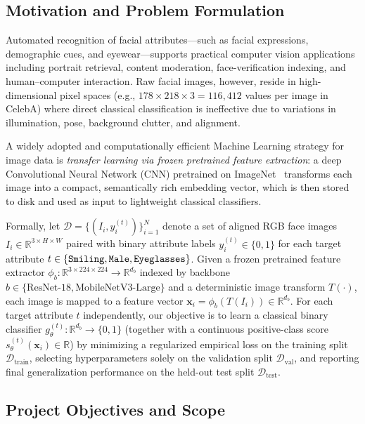 \documentclass[12pt,a4paper]{article}
\newcommand{\code}[1]{\texttt{#1}}
\begin{document}
\subsection{Motivation and Problem Formulation}
\label{subsec:problem_formulation}

Automated recognition of facial attributes---such as facial expressions, demographic cues, and eyewear---supports practical computer vision applications including portrait retrieval, content moderation, face-verification indexing, and human--computer interaction. Raw facial images, however, reside in high-dimensional pixel spaces (e.g., $178 \times 218 \times 3 = 116{,}412$ values per image in CelebA) where direct classical classification is ineffective due to variations in illumination, pose, background clutter, and alignment.

A widely adopted and computationally efficient Machine Learning strategy for image data is \emph{transfer learning via frozen pretrained feature extraction}: a deep Convolutional Neural Network (CNN) pretrained on ImageNet~\cite{deng2009imagenet} transforms each image into a compact, semantically rich embedding vector, which is then stored to disk and used as input to lightweight classical classifiers.

Formally, let $\mathcal{D} = \{(I_i, y_i^{(t)})\}_{i=1}^{N}$ denote a set of aligned RGB face images $I_i \in \mathbb{R}^{3 \times H \times W}$ paired with binary attribute labels $y_i^{(t)} \in \{0, 1\}$ for each target attribute $t \in \{\text{\code{Smiling}}, \text{\code{Male}}, \text{\code{Eyeglasses}}\}$. Given a frozen pretrained feature extractor $\phi_b : \mathbb{R}^{3 \times 224 \times 224} \to \mathbb{R}^{d_b}$ indexed by backbone $b \in \{\text{ResNet-18}, \text{MobileNetV3-Large}\}$ and a deterministic image transform $T(\cdot)$, each image is mapped to a feature vector $\mathbf{x}_i = \phi_b(T(I_i)) \in \mathbb{R}^{d_b}$. For each target attribute $t$ independently, our objective is to learn a classical binary classifier $g_{\theta}^{(t)} : \mathbb{R}^{d_b} \to \{0, 1\}$ (together with a continuous positive-class score $s_{\theta}^{(t)}(\mathbf{x}_i) \in \mathbb{R}$) by minimizing a regularized empirical loss on the training split $\mathcal{D}_{\text{train}}$, selecting hyperparameters solely on the validation split $\mathcal{D}_{\text{val}}$, and reporting final generalization performance on the held-out test split $\mathcal{D}_{\text{test}}$.

\subsection{Project Objectives and Scope}
\label{subsec:objectives}
\end{document}

